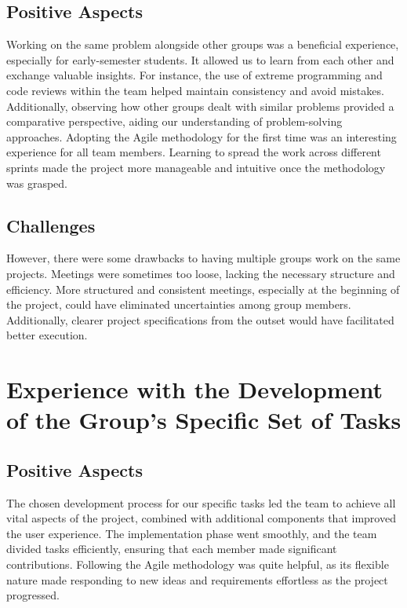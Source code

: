 \documentclass[12pt]{report}
\begin{document}
\subsection*{Positive Aspects}
Working on the same problem alongside other groups was a beneficial experience, especially for early-semester students.
It allowed us to learn from each other and exchange valuable insights. For instance, the use of extreme 
programming and code reviews within the team helped maintain consistency and avoid mistakes. Additionally, observing 
how other groups dealt with similar problems provided a comparative perspective, aiding our understanding of 
problem-solving approaches. Adopting the Agile methodology for the first time was an interesting experience for all 
team members. Learning to spread the work across different sprints made the project more manageable and intuitive 
once the methodology was grasped.

\subsection*{Challenges}
However, there were some drawbacks to having multiple groups work on the same projects. 
Meetings were sometimes too loose, lacking the necessary structure and efficiency. 
More structured and consistent meetings, especially at the beginning of the project, could have eliminated 
uncertainties among group members. Additionally, clearer project specifications from the outset would have 
facilitated better execution.

\section{Experience with the Development of the Group's Specific Set of Tasks}

\subsection*{Positive Aspects}
The chosen development process for our specific tasks led the team to achieve all vital aspects of the project, 
combined with additional components that improved the user experience. The implementation phase went smoothly, 
and the team divided tasks efficiently, ensuring that each member made significant contributions. Following the 
Agile methodology was quite helpful, as its flexible nature made responding to new ideas and requirements 
effortless as the project progressed.
\end{document}
